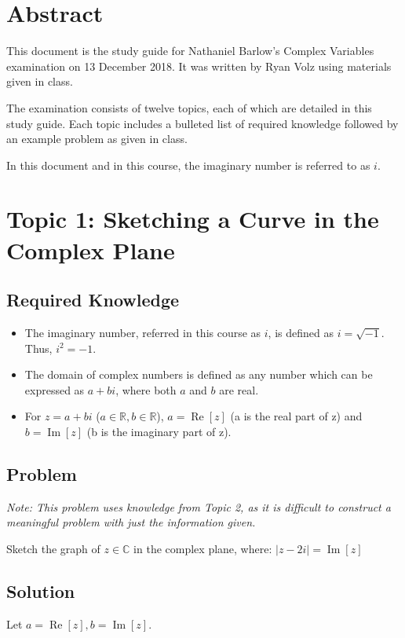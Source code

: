 \documentclass[12pt]{article}
\newcommand{\real}{\mathbb{R}}
\newcommand{\complex}{\mathbb{C}}
\renewcommand{\Re}{\operatorname{Re}}
\renewcommand{\Im}{\operatorname{Im}}
\begin{document}
\normalsize
\section {Abstract}
This document is the study guide for Nathaniel Barlow's Complex Variables examination on 13 December 2018.  It was written by Ryan Volz using materials given in class.

The examination consists of twelve topics, each of which are detailed in this study guide.  Each topic includes a bulleted list of required knowledge followed by an example problem as given in class.

In this document and in this course, the imaginary number is referred to as $i$.

\section{Topic 1: Sketching a Curve in the Complex Plane}
\subsection{Required Knowledge}
\begin{itemize}
    \item The imaginary number, referred in this course as $i$, is defined as $i=\sqrt{-1}$.  Thus, $i^2=-1$.
    \item The domain of complex numbers is defined as any number which can be expressed as $a+bi$, where both $a$ and $b$ are real.
    \item For $z=a+bi$ ($a\in\real, b\in\real$), $a=\Re[z]$ (a is the real part of z) and $b=\Im[z]$ (b is the imaginary part of z).
\end{itemize}
\subsection{Problem}
\textit{Note: This problem uses knowledge from Topic 2, as it is difficult to construct a meaningful problem with just the information given.}

Sketch the graph of $z\in\complex$ in the complex plane, where:
$|z-2i|=\Im[z]$
\subsection{Solution}
Let $a=\Re[z], b=\Im[z]$.
\end{document}
